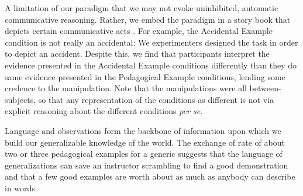 \documentclass[10pt,letterpaper]{article}
\newcommand{\soph}[1]{\textcolor{Green}{[sb: #1]}}
\begin{document}
A limitation of our paradigm that we may not evoke uninhibited, automatic communicative reasoning. Rather, we embed the paradigm in a story book that depicts certain communicative acts \cite{clark2016depicting}.
For example, the Accidental Example condition is not really an accidental: We experimenters designed the task in order to depict an accident.
Despite this, we find that participants interpret the evidence presented in the Accidental Example conditions differently than they do same evidence presented in the Pedagogical Example conditions, lending some credence to the manipulation.
Note that the manipulations were all between-subjects, so that any representation of the conditions as different is not via explicit reasoning about the different conditions \emph{per se}.

Language and observations form the backbone of information upon which we build our generalizable knowledge of the world. 
The exchange of rate of about two or three pedagogical examples for a generic suggests that the language of generalizations can save an instructor scrambling to find a good demonstration and that a few good examples are worth about as much as anybody can describe in words.


\end{document}
